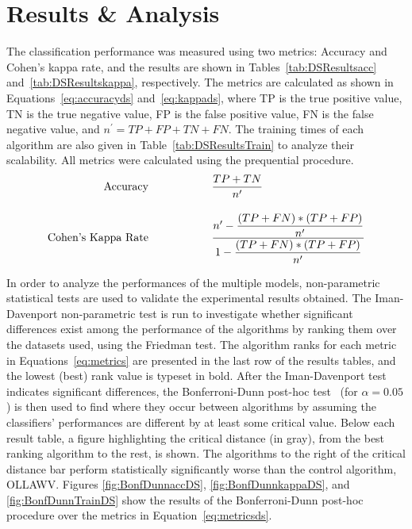 \documentclass[reqno]{vcuthesis}
\newcommand\tab[1][1cm]{\hspace*{#1}}
\numberwithin{equation}{chapter}
\begin{document}
\section{Results \& Analysis}
The classification performance was measured using two metrics: Accuracy and Cohen's kappa rate, and the results are shown in Tables~\ref{tab:DSResultsacc} and~\ref{tab:DSResultskappa}, respectively. The metrics are calculated as shown in Equations~\ref{eq:accuracyds} and~\ref{eq:kappads}, where TP is the true positive value, TN is the true negative value, FP is the false positive value, FN is the false negative value, and $n^\prime = TP + FP + TN + FN$. The training times of each algorithm are also given in Table~\ref{tab:DSResultsTrain} to analyze their scalability. All metrics were calculated using the prequential procedure. 
\begin{subequations}
\label{eq:metricsds}
\begin{align}
\text{Accuracy} \tab \tab &\dfrac{TP+TN}{n^\prime} \label{eq:accuracyds}\\[10pt]
\text{Cohen's Kappa Rate} \tab \tab &\dfrac{n^\prime - \dfrac{(TP+FN)*(TP+FP)}{n^\prime}}{1 - \dfrac{(TP+FN)*(TP+FP)}{n^\prime}} \label{eq:kappads}
\end{align}
\end{subequations}

In order to analyze the performances of the multiple models, non-parametric statistical tests are used to validate the experimental results obtained. The Iman-Davenport non-parametric test is run to investigate whether significant differences exist among the performance of the algorithms by ranking them over the datasets used, using the Friedman test. The algorithm ranks for each metric in Equations~\eqref{eq:metrics} are presented in the last row of the results tables, and the lowest (best) rank value is typeset in bold. After the Iman-Davenport test indicates significant differences, the Bonferroni-Dunn post-hoc test~\cite{Dunn1961} (for $\alpha = 0.05$) is then used to find where they occur between algorithms by assuming the classifiers' performances are different by at least some critical value. Below each result table, a figure highlighting the critical distance (in gray), from the best ranking algorithm to the rest, is shown. The algorithms to the right of the critical distance bar perform statistically significantly worse than the control algorithm, OLLAWV. Figures \ref{fig:BonfDunnaccDS}, \ref{fig:BonfDunnkappaDS}, and \ref{fig:BonfDunnTrainDS} show the results of the Bonferroni-Dunn post-hoc procedure over the metrics in Equation~\eqref{eq:metricsds}.
\end{document}
